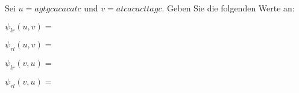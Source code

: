 \documentclass[12pt,a4paper]{scrartcl}
\begin{document}
Sei \(u=agtgcacacatc\) und \(v=atcacacttagc\). Geben Sie die folgenden
Werte an:

\(\psi_{lr}(u,v)=\)

\(\psi_{rl}(u,v)=\)

\(\psi_{lr}(v,u)=\)

\(\psi_{rl}(v,u)=\)
\end{document}
